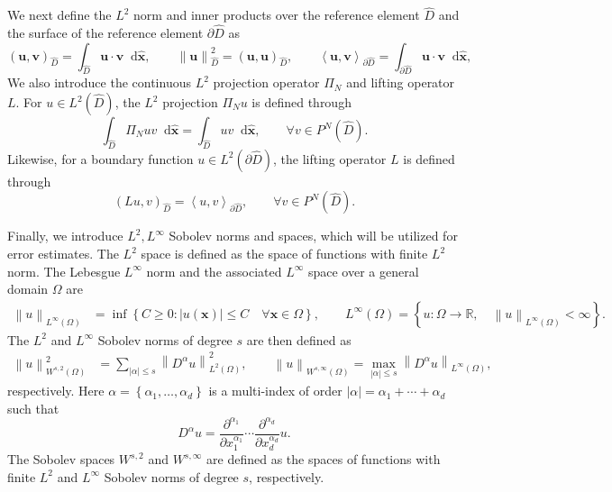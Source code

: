 \documentclass[preprint,10pt]{article}
\theoremstyle{definition}
\theoremstyle{lemma}
\theoremstyle{theorem}
\theoremstyle{assumption}
\renewcommand{\hat}{\widehat}
\newcommand{\pd}[2]{\frac{\partial#1}{\partial#2}}
\newcommand{\nor}[1]{\left\| #1 \right\|}
\newcommand{\LRp}[1]{\left( #1 \right)}
\newcommand{\LRa}[1]{\left\langle #1 \right\rangle}
\newcommand{\LRb}[1]{\left| #1 \right|}
\newcommand{\LRc}[1]{\left\{ #1 \right\}}
\newcommand*\diff[1]{\mathop{}\!{\mathrm{d}#1}} %
\begin{document}
We next define the $L^2$ norm and inner products over the reference element $\hat{D}$ and the surface of the reference element $\partial \hat{D}$ as
\[
  \LRp{\bm{u},\bm{v}}_{\hat{D}} =  \int_{\widehat{D}} \bm{u}\cdot\bm{v} \diff{\hat{\bm{x}}}, \qquad \nor{\bm{u}}^2_{\hat{D}} = (\bm{u},\bm{u})_{\hat{D}}, \qquad \LRa{\bm{u},\bm{v}}_{\partial \hat{D}} = \int_{\partial \hat{D}} \bm{u} \cdot \bm{v} \diff{\hat{\bm{x}}},
\]
We also introduce the continuous $L^2$ projection operator $\Pi_N$ and lifting operator $L$.  For $u \in L^2\LRp{\widehat{D}}$, the $L^2$ projection $\Pi_N u$ is defined through
\begin{equation}
\int_{\widehat{D}} \Pi_N u v \diff{\hat{\bm{x}}} = \int_{\widehat{D}} u v \diff{\hat{\bm{x}}}, \qquad \forall v\in P^N\LRp{\hat{D}}.
\label{eq:l2proj}
\end{equation}
Likewise, for a boundary function $u \in L^2\LRp{\partial \hat{D}}$, the lifting operator $L$ \cite{hesthaven2007nodal, di2011mathematical} is defined through 
\begin{equation}
\LRp{L u,v}_{\hat{D}} = \LRa{u,v}_{\partial \hat{D}}, \qquad \forall v \in P^N\LRp{\hat{D}}.
\label{eq:lift}
\end{equation}

Finally, we introduce $L^2, L^{\infty}$ Sobolev norms and spaces, which will be utilized for error estimates.  The $L^2$ space is defined as the space of functions with finite $L^2$ norm.  The Lebesgue $L^\infty$ norm and the associated $L^\infty$ space over a general domain $\Omega$ are 
\begin{align*}
\nor{u}_{L^{\infty}\LRp{\Omega}} &= \inf\LRc{C \geq 0: \LRb{u\LRp{\bm{x}}} \leq C \quad \forall \bm{x}\in \Omega}, \qquad
L^{\infty}\LRp{\Omega} = \LRc{u: \Omega\rightarrow \mathbb{R}, \quad \nor{u}_{L^{\infty}\LRp{\Omega}} < \infty}.
\end{align*}
The $L^2$ and $L^{\infty}$ Sobolev norms of degree $s$ are then defined  as
\begin{align*}
\nor{u}_{W^{s,2}\LRp{\Omega}}^2 &= {\sum_{\LRb{\alpha}\leq s} \nor{ D^{\alpha} u}_{L^2\LRp{\Omega}}^2}, \qquad \nor{u}_{W^{s,\infty}\LRp{\Omega}} = \max_{\LRb{\alpha}\leq s} \nor{D^{\alpha}u}_{L^{\infty}\LRp{\Omega}},
\end{align*}
respectively.  Here $\alpha = \LRc{\alpha_1,\ldots,\alpha_d}$ is a multi-index
of order $\LRb{\alpha} = \alpha_1 + \cdots + \alpha_d$ such that
\[
D^{\alpha}u = \pd{^{\alpha_1}}{x_1^{\alpha_1}}\cdots\pd{^{\alpha_d}}{x_d^{\alpha_d}} u.
\]
The Sobolev spaces $W^{s,2}$ and $W^{s,\infty}$ are defined as the spaces of functions with finite $L^2$ and $L^\infty$ Sobolev norms of degree $s$, respectively.
\end{document}
